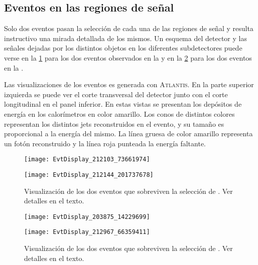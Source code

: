 \subsection{Eventos en las regiones de señal}

Solo dos eventos pasan la selección de cada una de las regiones de señal y resulta
instructivo una mirada detallada de los mismos. Un
esquema del detector y las se\~nales dejadas por los distintos objetos en los diferentes
subdetectores puede verse en la \cref{fig:evdisplay_srl} para los dos eventos
observados en la {\SRL} y en la \cref{fig:evdisplay_srh} para los dos eventos
en la {\SRH}.

Las visualizaciones de los eventos es generada con
\textsc{Atlantis}\cite{atlantis}. En la parte superior izquierda se puede ver el
corte transversal del detector junto con el corte longitudinal en el panel
inferior. En estas vistas se presentan los depósitos de energía en los
calorímetros en color amarillo. Los conos de distintos colores representan los
distintos jets reconstruidos en el evento, y su tama\~no es proporcional a la
energía del mismo. La línea gruesa de color amarillo representa un fotón
reconstruido y la línea roja punteada la energía faltante.



\begin{figure}[!htbp]
  \begin{center}

    \texttt{[image: EvtDisplay\_212103\_73661974]}

    \vspace{1cm}

    \texttt{[image: EvtDisplay\_212144\_201737678]}

    \caption{Visualización de los dos eventos que sobreviven la selección de {\SRL}. Ver detalles en el texto.}
    \label{fig:evdisplay_srl}
  \end{center}
\end{figure}


\begin{figure}[!htbp]
  \begin{center}

    \texttt{[image: EvtDisplay\_203875\_14229699]}

    \vspace{1cm}

    \texttt{[image: EvtDisplay\_212967\_66359411]}

  \caption{Visualización de los dos eventos que sobreviven la selección de {\SRH}. Ver detalles en el texto.}
  \label{fig:evdisplay_srh}
  \end{center}
\end{figure}


